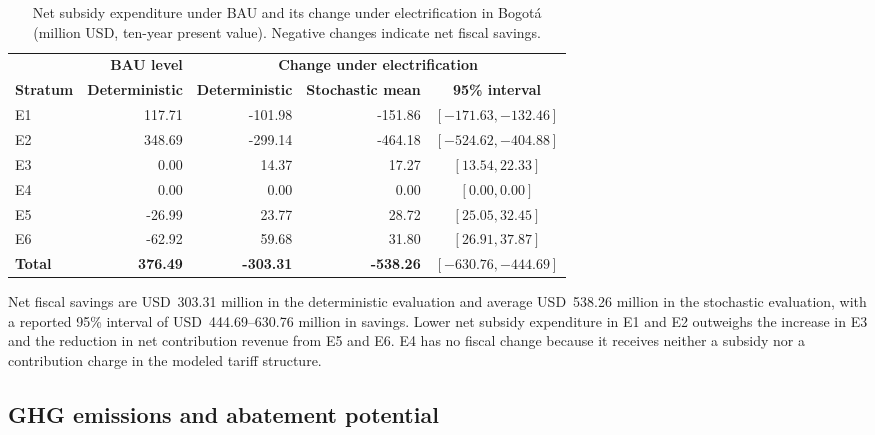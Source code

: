 \documentclass[authoryear,preprint,review,10pt]{elsarticle}
\begin{document}
\begin{table}[htbp]
    \centering
    \caption{Net subsidy expenditure under BAU and its change under electrification in Bogotá (million USD, ten-year present value). Negative changes indicate net fiscal savings.}
    \label{tab:fiscal_impact_aggregate}
    \begin{tabular}{lrrrc}
        \toprule
        & \textbf{BAU level} & \multicolumn{3}{c}{\textbf{Change under electrification}} \\
        \cmidrule(lr){3-5}
        \textbf{Stratum} & \textbf{Deterministic} & \textbf{Deterministic}
        & \textbf{Stochastic mean} & \textbf{95\% interval} \\
        \midrule
        E1 & 117.71 & -101.98 & -151.86 & $[-171.63,-132.46]$ \\
        E2 & 348.69 & -299.14 & -464.18 & $[-524.62,-404.88]$ \\
        E3 & 0.00   & 14.37   & 17.27   & $[13.54,22.33]$ \\
        E4 & 0.00   & 0.00    & 0.00    & $[0.00,0.00]$ \\
        E5 & -26.99 & 23.77   & 28.72   & $[25.05,32.45]$ \\
        E6 & -62.92 & 59.68   & 31.80   & $[26.91,37.87]$ \\
        \midrule
        \textbf{Total} & \textbf{376.49} & \textbf{-303.31}
        & \textbf{-538.26} & $\boldsymbol{[-630.76,-444.69]}$ \\
        \bottomrule
    \end{tabular}
\end{table}

Net fiscal savings are USD~303.31 million in the deterministic evaluation and average USD~538.26 million in the stochastic evaluation, with a reported 95\% interval of USD~444.69--630.76 million in savings. Lower net subsidy expenditure in E1 and E2 outweighs the increase in E3 and the reduction in net contribution revenue from E5 and E6. E4 has no fiscal change because it receives neither a subsidy nor a contribution charge in the modeled tariff structure.

\subsection{GHG emissions and abatement potential}
\label{results:ghg}
\end{document}
